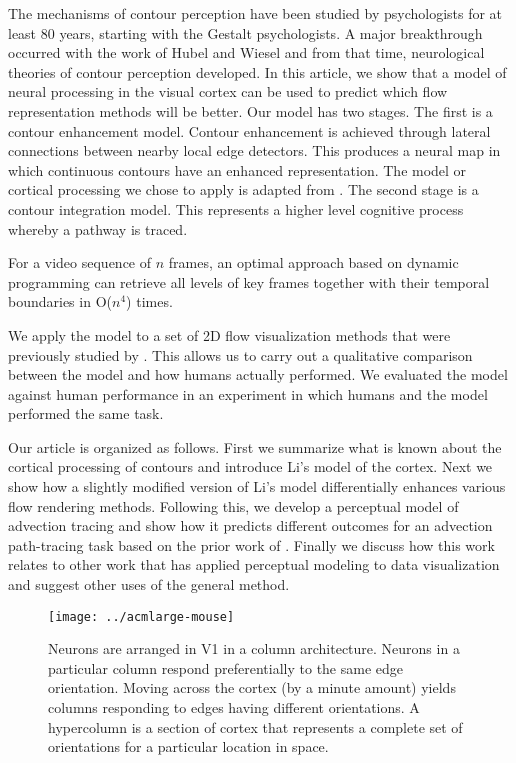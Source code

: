 \documentclass[prodmode,hillsideplop]{../acmlarge}
\begin{document}
The mechanisms of contour perception have been studied by
psychologists for at least 80 years, starting with the Gestalt
psychologists. A major breakthrough occurred with the work of Hubel
and Wiesel \citeyear{Hubel1962,Hubel1968} and from that time,
neurological theories of contour perception developed. In this
article, we show that a model of neural processing in the visual
cortex  can be used to predict which flow representation methods will
be better. Our model has two stages. The first is a contour
enhancement model. Contour enhancement is achieved through lateral
connections between nearby local edge detectors. This produces a
neural map in which continuous contours have an enhanced
representation. The model or cortical processing we chose to apply is
adapted from . The second stage is a contour
integration model. This represents a higher level cognitive process
whereby a pathway is traced.
\begin{theorem}
For a video sequence of $n$ frames, an optimal approach based on
dynamic programming can retrieve all levels of key frames together
with their temporal boundaries in O($n^4$) times.
\end{theorem}

We apply the model to a set of 2D flow visualization methods that
were previously studied by . This allows us to
carry out a qualitative comparison between the model and how humans
actually performed. We evaluated the model against human performance
in an experiment in which humans and the model performed the same task.

Our article is organized as follows. First we summarize what is
known about the cortical processing of contours and introduce Li's
\citeyear{Li1998a} model of the cortex. Next we show how a slightly
modified version of Li's model differentially enhances various flow
rendering methods. Following this, we develop a perceptual model of
advection tracing and show how it predicts different outcomes for an
advection path-tracing task based on the prior work of
. Finally we discuss how this work relates to
other work that has applied perceptual modeling to data visualization
and suggest other uses of the general method.

\begin{figure}[tp]
\centering
\texttt{[image: ../acmlarge-mouse]}
\caption{Neurons are arranged in V1 in a column architecture. Neurons
in a particular column respond preferentially to the same edge
orientation. Moving across the cortex (by a minute amount) yields
columns responding to edges having different orientations. A
hypercolumn is a section of cortex that represents a complete set of
orientations for a particular location in space.}
\label{corticalarchitecturefig}
\end{figure}
\end{document}
